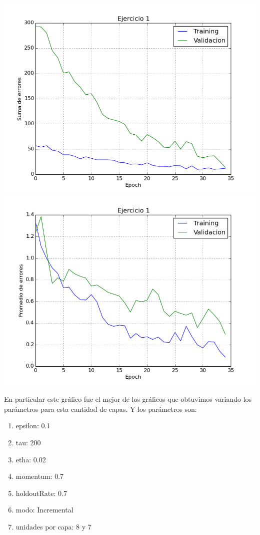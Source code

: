 \includegraphics[scale=0.4]{img/ej100207187sum}
\includegraphics[scale=0.4]{img/ej100207187mean}

En particular este gráfico fue el mejor de los gráficos que obtuvimos variando los parámetros para esta cantidad de capas. Y los parámetros son:
\begin{enumerate}
\item epsilon: 0.1
\item tau: 200
\item etha: 0.02
\item momentum: 0.7
\item holdoutRate: 0.7
\item modo: Incremental
\item unidades por capa: 8 y 7
\end{enumerate}

